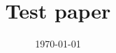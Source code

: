 


\title{
	Test paper%
}
\author{}
\date{\today}




\begin{titlepage}
  \maketitle

	\begin{abstract}
		\noindent

	\end{abstract}

\end{titlepage}




\clearpage
\renewcommand*{\bibfont}{\small}
\printbibliography






